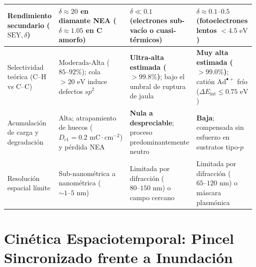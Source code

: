 \documentclass[10pt,twocolumn,a4paper]{article}
\begin{document}
\begin{table}[t]
{\begin{tabular}{@{}p{3.6cm}p{4.3cm}p{4.3cm}p{4.3cm}@{}}
Rendimiento secundario ($\text{SEY}, \delta$) & $\delta \approx 20$ en diamante NEA ($\delta \approx 1.05$ en C amorfo) & $\delta \ll 0.1$ (electrones sub-vacío o cuasi-térmicos) & $\delta \approx 0.1\text{--}0.5$ (fotoelectrones lentos $<4.5\text{ eV}$) \\ \midrule
Selectividad teórica ($\text{C--H}$ vs $\text{C--C}$) & Moderada-Alta ($85\text{--}92\%$); cola $>20\text{ eV}$ induce defectos $sp^2$ & \textbf{Ultra-alta estimada ($>99.8\%$)}; bajo el umbral de ruptura de jaula & \textbf{Muy alta estimada ($>99.0\%$)}; catión $\text{Ad}^{\bullet+}$ frío ($\Delta E_{\text{int}} \le 0.75\text{ eV}$) \\ \midrule
Acumulación de carga y degradación & Alta; atrapamiento de huecos ($D_{c1}=0.2\text{ mC}\cdot\text{cm}^{-2}$) y pérdida NEA & \textbf{Nula a despreciable}; proceso predominantemente neutro & \textbf{Baja}; compensada sin esfuerzo en sustratos tipo-$p$ \\ \midrule
Resolución espacial límite & Sub-nanométrica a nanométrica ($\sim 1\text{--}5\text{ nm}$) & Limitada por difracción ($80\text{--}150\text{ nm}$) o campo cercano & Limitada por difracción ($65\text{--}120\text{ nm}$) o máscara plasmónica \\ \bottomrule
\end{tabular}%
}
\end{table}

\section{Cinética Espaciotemporal: Pincel Sincronizado frente a Inundación}
\end{document}

